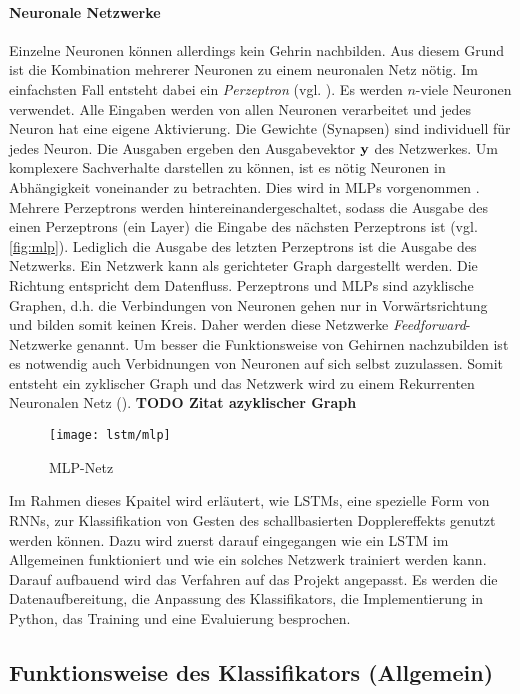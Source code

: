 \paragraph{Neuronale Netzwerke}
Einzelne Neuronen können allerdings kein Gehrin nachbilden. Aus diesem Grund ist
die Kombination mehrerer Neuronen zu einem neuronalen Netz nötig. Im einfachsten
Fall entsteht dabei ein \textit{Perzeptron} (vgl.
\cite{rosenblatt58a,1165576}). Es werden $n$-viele Neuronen
verwendet. Alle Eingaben werden von allen Neuronen verarbeitet und jedes Neuron
hat eine eigene Aktivierung. Die Gewichte (Synapsen) sind individuell für jedes
Neuron. Die Ausgaben ergeben den Ausgabevektor $\bf{y}$ des Netzwerkes. Um
komplexere Sachverhalte darstellen zu können, ist es nötig Neuronen in Abhängigkeit
voneinander zu betrachten. Dies wird in \acp{MLP} vorgenommen \cite{1165576}.
Mehrere Perzeptrons werden hintereinandergeschaltet, sodass die Ausgabe des
einen Perzeptrons (ein Layer) die Eingabe des nächsten Perzeptrons ist (vgl.
\autoref{fig:mlp}).
Lediglich die Ausgabe des letzten Perzeptrons ist die Ausgabe des Netzwerks.
Ein Netzwerk kann als gerichteter Graph dargestellt werden. Die Richtung
entspricht dem Datenfluss. Perzeptrons und \acp{MLP} sind azyklische Graphen,
d.h. die Verbindungen von Neuronen gehen nur in Vorwärtsrichtung und bilden
somit keinen Kreis. Daher werden diese Netzwerke \textit{Feedforward}-Netzwerke
genannt. Um besser die Funktionsweise von Gehirnen nachzubilden ist es notwendig
auch Verbidnungen von Neuronen auf sich selbst zuzulassen. Somit entsteht ein
zyklischer Graph und das Netzwerk wird zu einem Rekurrenten Neuronalen Netz
().
\textbf{TODO Zitat azyklischer Graph}

\begin{figure}[htbp]
    \centering
   \texttt{[image: lstm/mlp]}
\caption{MLP-Netz}
\label{fig:mlp}
\end{figure}

Im Rahmen dieses Kpaitel wird erläutert, wie \acsp{LSTM}, eine spezielle Form
von \acp{RNN}, zur Klassifikation von Gesten des schallbasierten Dopplereffekts
genutzt werden können. Dazu wird zuerst darauf eingegangen wie ein \ac{LSTM} im
Allgemeinen funktioniert und wie ein solches Netzwerk trainiert werden kann.
Darauf aufbauend wird das Verfahren auf das Projekt angepasst. Es werden die
Datenaufbereitung, die Anpassung des Klassifikators, die Implementierung in
Python, das Training und eine Evaluierung besprochen.


\subsection{Funktionsweise des Klassifikators (Allgemein)}

